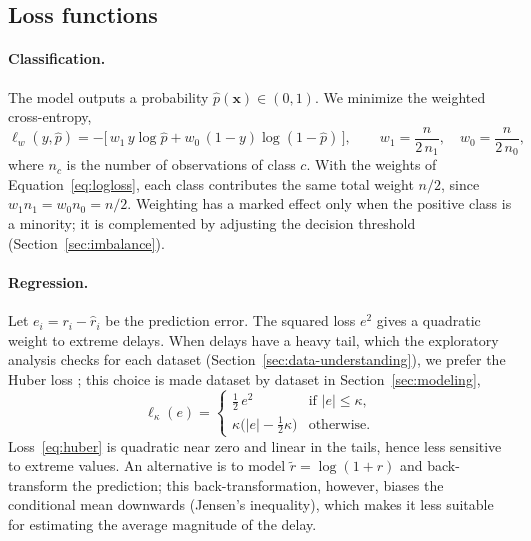 \documentclass[11pt,a4paper]{article}
\theoremstyle{definition}
\begin{document}
\subsection{Loss functions}
\label{sec:pertes}

\paragraph{Classification.} The model outputs a probability $\hat{p}(\mathbf{x}) \in (0,1)$. We minimize the weighted cross-entropy,
\begin{equation}
  \ell_w(y, \hat{p}) = -\bigl[\, w_1\, y \log \hat{p} + w_0\, (1-y) \log(1-\hat{p}) \,\bigr],
  \qquad w_1 = \frac{n}{2\,n_1}, \quad w_0 = \frac{n}{2\,n_0},
  \label{eq:logloss}
\end{equation}
where $n_c$ is the number of observations of class $c$. With the weights of Equation~\eqref{eq:logloss}, each class contributes the same total weight $n/2$, since $w_1 n_1 = w_0 n_0 = n/2$. Weighting has a marked effect only when the positive class is a minority; it is complemented by adjusting the decision threshold (Section~\ref{sec:imbalance}).

\paragraph{Regression.} Let $e_i = r_i - \hat{r}_i$ be the prediction error. The squared loss $e^2$ gives a quadratic weight to extreme delays. When delays have a heavy tail, which the exploratory analysis checks for each dataset (Section~\ref{sec:data-understanding}), we prefer the Huber loss \cite{huber1964robust}; this choice is made dataset by dataset in Section~\ref{sec:modeling},
\begin{equation}
  \ell_\kappa(e) =
  \begin{cases}
    \tfrac{1}{2}\, e^{2} & \text{if } |e| \le \kappa,\\[0.5ex]
    \kappa \bigl(|e| - \tfrac{1}{2}\kappa\bigr) & \text{otherwise.}
  \end{cases}
  \label{eq:huber}
\end{equation}
Loss~\eqref{eq:huber} is quadratic near zero and linear in the tails, hence less sensitive to extreme values. An alternative is to model $\tilde{r} = \log(1+r)$ and back-transform the prediction; this back-transformation, however, biases the conditional mean downwards (Jensen's inequality), which makes it less suitable for estimating the average magnitude of the delay.
\end{document}
